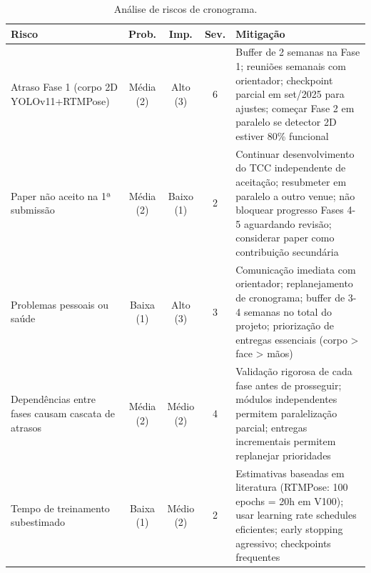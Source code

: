 \documentclass[12pt, a4paper]{article}
\begin{document}
\begin{table}[H]
    \centering
    \caption{Análise de riscos de cronograma.}
    \small
    \begin{tabular}{|p{3.5cm}|c|c|c|p{4cm}|}
        \hline
        \textbf{Risco} & \textbf{Prob.} & \textbf{Imp.} & \textbf{Sev.} & \textbf{Mitigação} \\ \hline
        
        Atraso Fase 1 (corpo 2D YOLOv11+RTMPose) & 
        Média (2) & 
        Alto (3) & 
        6 & 
        Buffer de 2 semanas na Fase 1; reuniões semanais com orientador; checkpoint parcial em set/2025 para ajustes; começar Fase 2 em paralelo se detector 2D estiver 80\% funcional \\ \hline
        
        Paper não aceito na 1ª submissão & 
        Média (2) & 
        Baixo (1) & 
        2 & 
        Continuar desenvolvimento do TCC independente de aceitação; resubmeter em paralelo a outro venue; não bloquear progresso Fases 4-5 aguardando revisão; considerar paper como contribuição secundária \\ \hline
        
        Problemas pessoais ou saúde & 
        Baixa (1) & 
        Alto (3) & 
        3 & 
        Comunicação imediata com orientador; replanejamento de cronograma; buffer de 3-4 semanas no total do projeto; priorização de entregas essenciais (corpo > face > mãos) \\ \hline
        
        Dependências entre fases causam cascata de atrasos & 
        Média (2) & 
        Médio (2) & 
        4 & 
        Validação rigorosa de cada fase antes de prosseguir; módulos independentes permitem paralelização parcial; entregas incrementais permitem replanejar prioridades \\ \hline
        
        Tempo de treinamento subestimado & 
        Baixa (1) & 
        Médio (2) & 
        2 & 
        Estimativas baseadas em literatura (RTMPose: 100 epochs = 20h em V100); usar learning rate schedules eficientes; early stopping agressivo; checkpoints frequentes \\ \hline
        
    \end{tabular}
\end{table}
\end{document}
